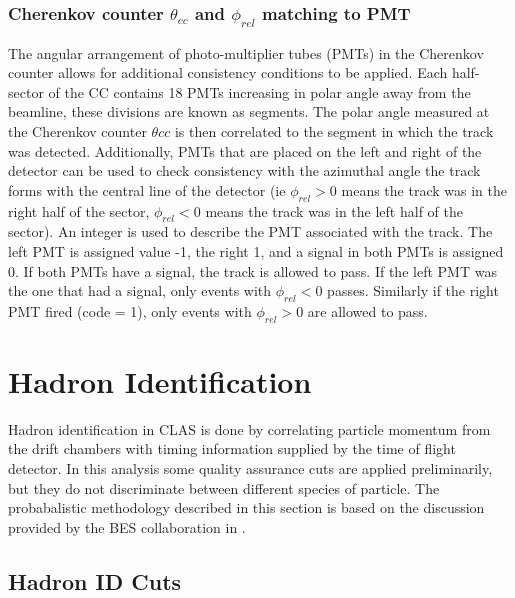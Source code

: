 \subsubsection{Cherenkov counter $\theta_{cc}$ and $\phi_{rel}$ matching to PMT}
The angular arrangement of photo-multiplier tubes (PMTs) in the Cherenkov counter allows for additional consistency conditions to be applied.  Each half-sector of the CC contains 18 PMTs increasing in polar angle away from the beamline, these divisions are known as segments.  The polar angle measured at the Cherenkov counter $\theta{cc}$ is then correlated to the segment in which the track was detected.  Additionally, PMTs that are placed on the left and right of the detector can be used to check consistency with the azimuthal angle the track forms with the central line of the detector (ie $\phi_{rel} > 0$ means the track was in the right half of the sector, $\phi_{rel} < 0$ means the track was in the left half of the sector).  An integer is used to describe the PMT associated with the track.  The left PMT is assigned value -1, the right 1, and a signal in both PMTs is assigned 0.  If both PMTs have a signal, the track is allowed to pass.  If the left PMT was the one that had a signal, only events with $\phi_{rel} < 0$ passes.  Similarly if the right PMT fired (code = 1), only events with $\phi_{rel} > 0$ are allowed to pass. 


\section{Hadron Identification}
Hadron identification in CLAS is done by correlating particle momentum from the drift chambers with timing information supplied by the time of flight detector.  In this analysis some quality assurance cuts are applied preliminarily, but they do not discriminate between different species of particle.  The probabalistic methodology described in this section is based on the discussion provided by the BES collaboration in \cite{misc-ping:2009}.

\subsection{Hadron ID Cuts}

